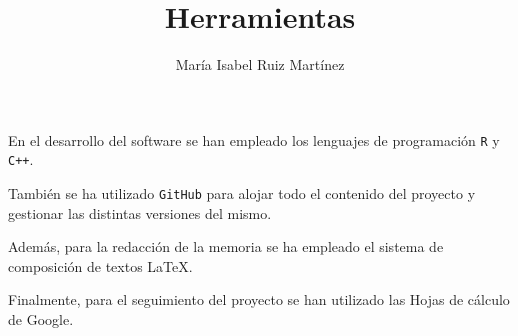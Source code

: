 \documentclass[10pt,a4paper]{article}
\author{María Isabel Ruiz Martínez}
\title{Herramientas}
\begin{document}
\maketitle

En el desarrollo del software se han empleado los lenguajes de programación \texttt{R} y \texttt{C++}.

También se ha utilizado \texttt{GitHub} para alojar todo el contenido del proyecto y gestionar las distintas versiones del mismo.

Además, para la redacción de la memoria se ha empleado el sistema de composición de textos \LaTeX.

Finalmente, para el seguimiento del proyecto se han utilizado las Hojas de cálculo de Google.
\end{document}
